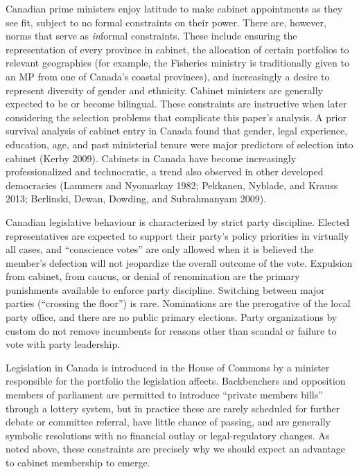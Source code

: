 \documentclass[letter,12pt]{article}
\begin{document}
Canadian prime ministers enjoy latitude to make cabinet appointments as they see fit, subject to no formal constraints on their power. There are, however, norms that serve as \textit{in}formal constraints. These include ensuring the representation of every province in cabinet, the allocation of certain portfolios to relevant geographies (for example, the Fisheries ministry is traditionally given to an MP from one of Canada's coastal provinces), and increasingly a desire to represent diversity of gender and ethnicity. Cabinet ministers are generally expected to be or become bilingual. These constraints are instructive when later considering the selection problems that complicate this paper's analysis. A prior survival analysis of cabinet entry in Canada found that gender, legal experience, education, age, and past ministerial tenure were major predictors of selection into cabinet (Kerby 2009). Cabinets in Canada have become increasingly professionalized and technocratic, a trend also observed in other developed democracies (Lammers and Nyomarkay 1982; Pekkanen, Nyblade, and Krauss 2013; Berlinski, Dewan, Dowding, and Subrahmanyam 2009).

Canadian legislative behaviour is characterized by strict party discipline. Elected representatives are expected to support their party's policy priorities in virtually all cases, and ``conscience votes'' are only allowed when it is believed the member's defection will not jeopardize the overall outcome of the vote. Expulsion from cabinet, from caucus, or denial of renomination are the primary punishments available to enforce party discipline. Switching between major parties (``crossing the floor'') is rare. Nominations are the prerogative of the local party office, and there are no public primary elections.   Party organizations by custom do not remove incumbents for reasons other than scandal or failure to vote with party leadership. 

Legislation in Canada is introduced in the House of Commons by a minister responsible for the portfolio the legislation affects. Backbenchers and opposition members of parliament are permitted to introduce ``private members bills'' through a lottery system, but in practice these are rarely scheduled for further debate or committee referral, have little chance of passing, and are generally symbolic resolutions with no financial outlay or legal-regulatory changes. As noted above, these constraints are precisely why we should expect an advantage to cabinet membership to emerge.
\end{document}
